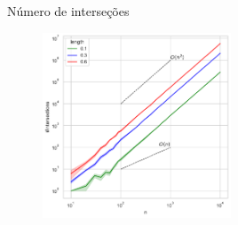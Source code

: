 \documentclass[aspectratio=169,usenames,dvipsnames]{beamer}
\begin{document}
\begin{frame}{Número de interseções}
  \begin{figure}
    \includegraphics[width=0.5\textwidth]{figs/exemplos/n_intersections_log.pdf}
  \end{figure}
\end{frame}
\end{document}
